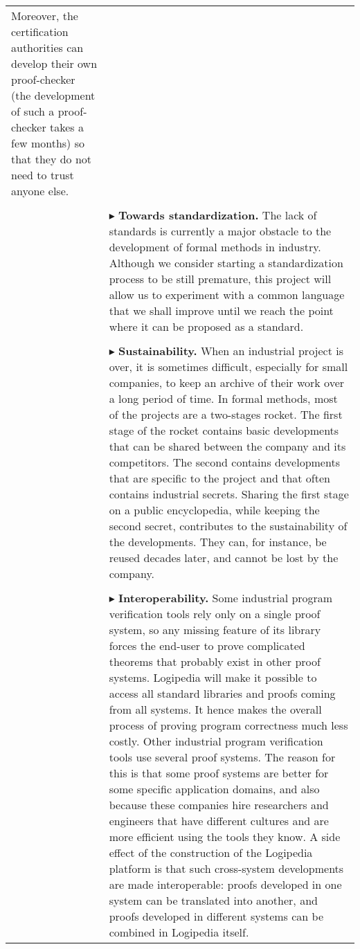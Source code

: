 \begin{longtable}{|p{}|p{}|}
Moreover, the certification authorities can develop their own
proof-checker (the development of such a proof-checker takes a few
months) so that they do not need to trust anyone else.\\
&\\
&
$\blacktriangleright$
{\bf Towards standardization.}
The lack of standards is currently a major obstacle to the development
of formal methods in industry. Although we consider starting a
standardization process to be still premature, this project will allow us
to experiment with a common language that we shall improve until we
reach the point where it can be proposed as a standard.\\
&\\
&
$\blacktriangleright$
{\bf Sustainability.}
When an industrial project is over, it is sometimes difficult,
especially for small companies, to keep an archive of their work over
a long period of time. In formal methods, most of the projects are a
two-stages rocket. The first stage of the rocket contains basic
developments that can be shared between the company and its
competitors. The second contains developments that are specific to the
project and that often contains industrial secrets.
Sharing the first stage on a public encyclopedia, while keeping the
second secret, contributes to the sustainability of the
developments. They can, for instance, be reused decades later, and
cannot be lost by the company.\\
&\\
&
$\blacktriangleright$
{\bf Interoperability.}
  Some industrial program verification tools rely only on a single
  proof system, so any missing feature of its library forces the
  end-user to prove complicated theorems that probably exist in other
  proof systems. Logipedia will make it possible to access all
  standard libraries and proofs coming from all systems. It hence
  makes the overall process of proving program correctness much less costly.
  Other industrial program verification tools use several proof
  systems. The reason for this is that some proof systems are better for some
  specific application domains, and also
  because these companies hire researchers and engineers that have
  different cultures and are more efficient using the tools they know.
  A side effect of the construction of the Logipedia platform is that
  such cross-system developments are made interoperable: proofs
  developed in one system can be translated into another, and
  proofs developed in different systems can be combined in
  Logipedia itself.\\

\end{longtable}
